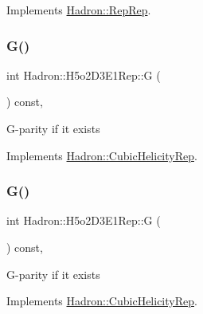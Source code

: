 Implements \mbox{\hyperlink{structHadron_1_1RepRep_a92c8802e5ed7afd7da43ccfd5b7cd92b}{Hadron\+::\+Rep\+Rep}}.

\mbox{\label{structHadron_1_1H5o2D3E1Rep_a16cc229559c2cadc22efcb715e8efd7b}} 
\subsubsection{\texorpdfstring{G()}{G()}\hspace{0.1cm}{\footnotesize\ttfamily [1/3]}}
{\footnotesize\ttfamily int Hadron\+::\+H5o2\+D3\+E1\+Rep\+::G (\begin{DoxyParamCaption}{ }\end{DoxyParamCaption}) const\hspace{0.3cm}{\ttfamily [inline]}, {\ttfamily [virtual]}}

G-\/parity if it exists 

Implements \mbox{\hyperlink{structHadron_1_1CubicHelicityRep_a50689f42be1e6170aa8cf6ad0597018b}{Hadron\+::\+Cubic\+Helicity\+Rep}}.

\mbox{\label{structHadron_1_1H5o2D3E1Rep_a16cc229559c2cadc22efcb715e8efd7b}} 
\subsubsection{\texorpdfstring{G()}{G()}\hspace{0.1cm}{\footnotesize\ttfamily [2/3]}}
{\footnotesize\ttfamily int Hadron\+::\+H5o2\+D3\+E1\+Rep\+::G (\begin{DoxyParamCaption}{ }\end{DoxyParamCaption}) const\hspace{0.3cm}{\ttfamily [inline]}, {\ttfamily [virtual]}}

G-\/parity if it exists 

Implements \mbox{\hyperlink{structHadron_1_1CubicHelicityRep_a50689f42be1e6170aa8cf6ad0597018b}{Hadron\+::\+Cubic\+Helicity\+Rep}}.

\mbox{\label{structHadron_1_1H5o2D3E1Rep_a16cc229559c2cadc22efcb715e8efd7b}} 
